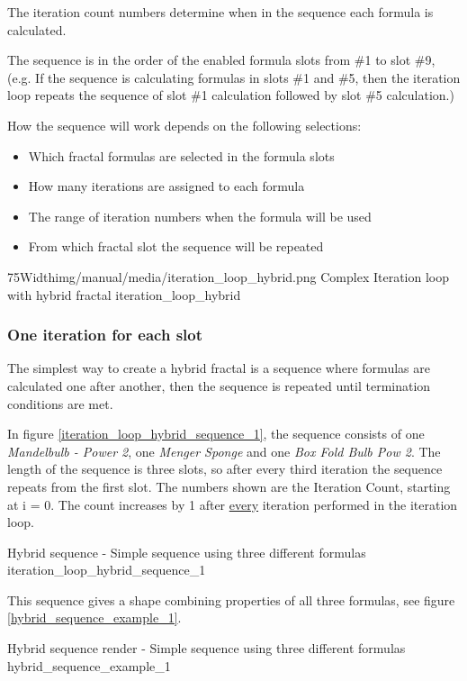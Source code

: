 The iteration count numbers determine when in the sequence each formula is calculated.

The sequence is in the order of the enabled formula slots from \#1 to slot \#9, (e.g. If the sequence is calculating formulas in slots
\#1 and \#5, then the iteration loop repeats the sequence of slot \#1 calculation followed by slot
\#5 calculation.)

How the sequence will work depends on the following selections:
\begin{itemize}
	\item Which fractal formulas are selected in the formula slots
	\item How many iterations are assigned to each formula
	\item The range of iteration numbers when the formula will be used
	\item From which fractal slot the sequence will be repeated
\end{itemize}

\simpleImageWithCaption75Width{img/manual/media/iteration_loop_hybrid.png}
{Complex Iteration loop with hybrid fractal}
{iteration_loop_hybrid}

\subsubsection{One iteration for each slot}

The simplest way to create a hybrid fractal is a sequence where formulas are calculated one after another, then the sequence is repeated until termination conditions are met.

In figure \ref{iteration_loop_hybrid_sequence_1}, the sequence consists of one \emph{Mandelbulb - Power 2}, one \emph{Menger Sponge} and
one \emph{Box Fold Bulb Pow 2}. The length of the sequence is three slots, so after every third iteration the sequence repeats from the first slot. The numbers shown are the Iteration Count, starting at i = 0. The count increases by 1 after \underline{every} iteration performed in the iteration loop.

{Hybrid sequence - Simple sequence using three different formulas}
{iteration_loop_hybrid_sequence_1}

This sequence gives a shape combining properties of all three
formulas, see figure \ref{hybrid_sequence_example_1}.

{Hybrid sequence render - Simple sequence using three different formulas}
{hybrid_sequence_example_1}

